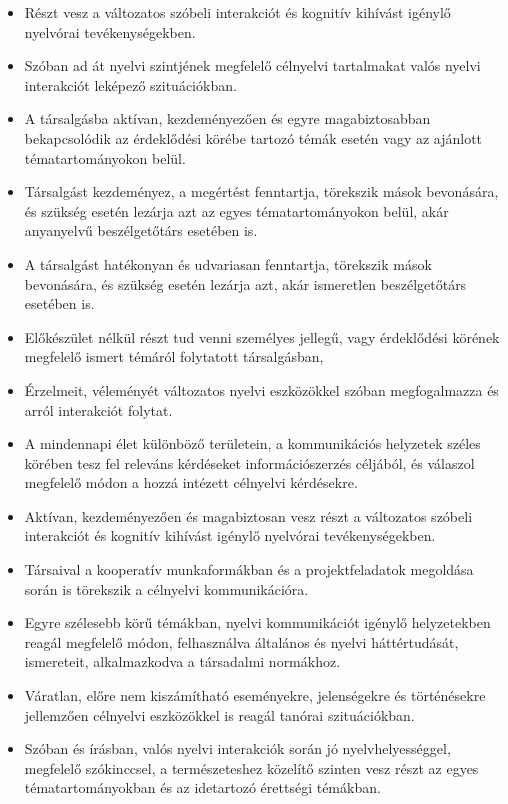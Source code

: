 \begin{itemize}
\item
  Részt vesz a változatos szóbeli interakciót és kognitív kihívást
  igénylő nyelvórai tevékenységekben.
\item
  Szóban ad át nyelvi szintjének megfelelő célnyelvi tartalmakat valós
  nyelvi interakciót leképező szituációkban.
\item
  A társalgásba aktívan, kezdeményezően és egyre magabiztosabban
  bekapcsolódik az érdeklődési körébe tartozó témák esetén vagy az
  ajánlott tématartományokon belül.
\item
  Társalgást kezdeményez, a megértést fenntartja, törekszik mások
  bevonására, és szükség esetén lezárja azt az egyes tématartományokon
  belül, akár anyanyelvű beszélgetőtárs esetében is.
\item
  A társalgást hatékonyan és udvariasan fenntartja, törekszik mások
  bevonására, és szükség esetén lezárja azt, akár ismeretlen
  beszélgetőtárs esetében is.
\item
  Előkészület nélkül részt tud venni személyes jellegű, vagy érdeklődési
  körének megfelelő ismert témáról folytatott társalgásban,
\item
  Érzelmeit, véleményét változatos nyelvi eszközökkel szóban
  megfogalmazza és arról interakciót folytat.
\item
  A mindennapi élet különböző területein, a kommunikációs helyzetek
  széles körében tesz fel releváns kérdéseket információszerzés
  céljából, és válaszol megfelelő módon a hozzá intézett célnyelvi
  kérdésekre.
\item
  Aktívan, kezdeményezően és magabiztosan vesz részt a változatos
  szóbeli interakciót és kognitív kihívást igénylő nyelvórai
  tevékenységekben.
\item
  Társaival a kooperatív munkaformákban és a projektfeladatok megoldása
  során is törekszik a célnyelvi kommunikációra.
\item
  Egyre szélesebb körű témákban, nyelvi kommunikációt igénylő
  helyzetekben reagál megfelelő módon, felhasználva általános és nyelvi
  háttértudását, ismereteit, alkalmazkodva a társadalmi normákhoz.
\item
  Váratlan, előre nem kiszámítható eseményekre, jelenségekre és
  történésekre jellemzően célnyelvi eszközökkel is reagál tanórai
  szituációkban.
\item
  Szóban és írásban, valós nyelvi interakciók során jó
  nyelvhelyességgel, megfelelő szókinccsel, a természeteshez közelítő
  szinten vesz részt az egyes tématartományokban és az idetartozó
  érettségi témákban.

\end{itemize}
